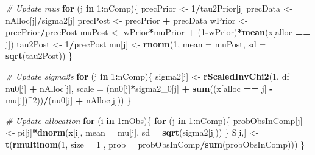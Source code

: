 \documentclass[]{article}
\newenvironment{Shaded}{\begin{snugshade}}{\end{snugshade}}
\newcommand{\CommentTok}[1]{\textcolor[rgb]{0.56,0.35,0.01}{\textit{#1}}}
\newcommand{\ControlFlowTok}[1]{\textcolor[rgb]{0.13,0.29,0.53}{\textbf{#1}}}
\newcommand{\DataTypeTok}[1]{\textcolor[rgb]{0.13,0.29,0.53}{#1}}
\newcommand{\DecValTok}[1]{\textcolor[rgb]{0.00,0.00,0.81}{#1}}
\newcommand{\KeywordTok}[1]{\textcolor[rgb]{0.13,0.29,0.53}{\textbf{#1}}}
\newcommand{\NormalTok}[1]{#1}
\newcommand{\OperatorTok}[1]{\textcolor[rgb]{0.81,0.36,0.00}{\textbf{#1}}}
\newcommand{\StringTok}[1]{\textcolor[rgb]{0.31,0.60,0.02}{#1}}
\begin{document}
\begin{Shaded}
\begin{Highlighting}[]
  \CommentTok{\# Update mu\textquotesingle{}s}
  \ControlFlowTok{for}\NormalTok{ (j }\ControlFlowTok{in} \DecValTok{1}\OperatorTok{:}\NormalTok{nComp)\{}
\NormalTok{    precPrior \textless{}{-}}\StringTok{ }\DecValTok{1}\OperatorTok{/}\NormalTok{tau2Prior[j]}
\NormalTok{    precData \textless{}{-}}\StringTok{ }\NormalTok{nAlloc[j]}\OperatorTok{/}\NormalTok{sigma2[j]}
\NormalTok{    precPost \textless{}{-}}\StringTok{ }\NormalTok{precPrior }\OperatorTok{+}\StringTok{ }\NormalTok{precData}
\NormalTok{    wPrior \textless{}{-}}\StringTok{ }\NormalTok{precPrior}\OperatorTok{/}\NormalTok{precPost}
\NormalTok{    muPost \textless{}{-}}\StringTok{ }\NormalTok{wPrior}\OperatorTok{*}\NormalTok{muPrior }\OperatorTok{+}\StringTok{ }\NormalTok{(}\DecValTok{1}\OperatorTok{{-}}\NormalTok{wPrior)}\OperatorTok{*}\KeywordTok{mean}\NormalTok{(x[alloc }\OperatorTok{==}\StringTok{ }\NormalTok{j])}
\NormalTok{    tau2Post \textless{}{-}}\StringTok{ }\DecValTok{1}\OperatorTok{/}\NormalTok{precPost}
\NormalTok{    mu[j] \textless{}{-}}\StringTok{ }\KeywordTok{rnorm}\NormalTok{(}\DecValTok{1}\NormalTok{, }\DataTypeTok{mean =}\NormalTok{ muPost, }\DataTypeTok{sd =} \KeywordTok{sqrt}\NormalTok{(tau2Post))}
\NormalTok{  \}}
  
  \CommentTok{\# Update sigma2\textquotesingle{}s}
  \ControlFlowTok{for}\NormalTok{ (j }\ControlFlowTok{in} \DecValTok{1}\OperatorTok{:}\NormalTok{nComp)\{}
\NormalTok{    sigma2[j] \textless{}{-}}\StringTok{ }\KeywordTok{rScaledInvChi2}\NormalTok{(}\DecValTok{1}\NormalTok{, }\DataTypeTok{df =}\NormalTok{ nu0[j] }\OperatorTok{+}\StringTok{ }\NormalTok{nAlloc[j], }\DataTypeTok{scale =}\NormalTok{ (nu0[j]}\OperatorTok{*}\NormalTok{sigma2\_}\DecValTok{0}\NormalTok{[j] }\OperatorTok{+}\StringTok{ }\KeywordTok{sum}\NormalTok{((x[alloc }\OperatorTok{==}\StringTok{ }\NormalTok{j] }\OperatorTok{{-}}\StringTok{ }\NormalTok{mu[j])}\OperatorTok{\^{}}\DecValTok{2}\NormalTok{))}\OperatorTok{/}\NormalTok{(nu0[j] }\OperatorTok{+}\StringTok{ }\NormalTok{nAlloc[j]))}
\NormalTok{  \}}
  
  \CommentTok{\# Update allocation}
  \ControlFlowTok{for}\NormalTok{ (i }\ControlFlowTok{in} \DecValTok{1}\OperatorTok{:}\NormalTok{nObs)\{}
    \ControlFlowTok{for}\NormalTok{ (j }\ControlFlowTok{in} \DecValTok{1}\OperatorTok{:}\NormalTok{nComp)\{}
\NormalTok{      probObsInComp[j] \textless{}{-}}\StringTok{ }\NormalTok{pi[j]}\OperatorTok{*}\KeywordTok{dnorm}\NormalTok{(x[i], }\DataTypeTok{mean =}\NormalTok{ mu[j], }\DataTypeTok{sd =} \KeywordTok{sqrt}\NormalTok{(sigma2[j]))}
\NormalTok{    \}}
\NormalTok{    S[i,] \textless{}{-}}\StringTok{ }\KeywordTok{t}\NormalTok{(}\KeywordTok{rmultinom}\NormalTok{(}\DecValTok{1}\NormalTok{, }\DataTypeTok{size =} \DecValTok{1}\NormalTok{ , }\DataTypeTok{prob =}\NormalTok{ probObsInComp}\OperatorTok{/}\KeywordTok{sum}\NormalTok{(probObsInComp)))}
\NormalTok{  \}}
  

\end{Highlighting}
\end{Shaded}
\end{document}
